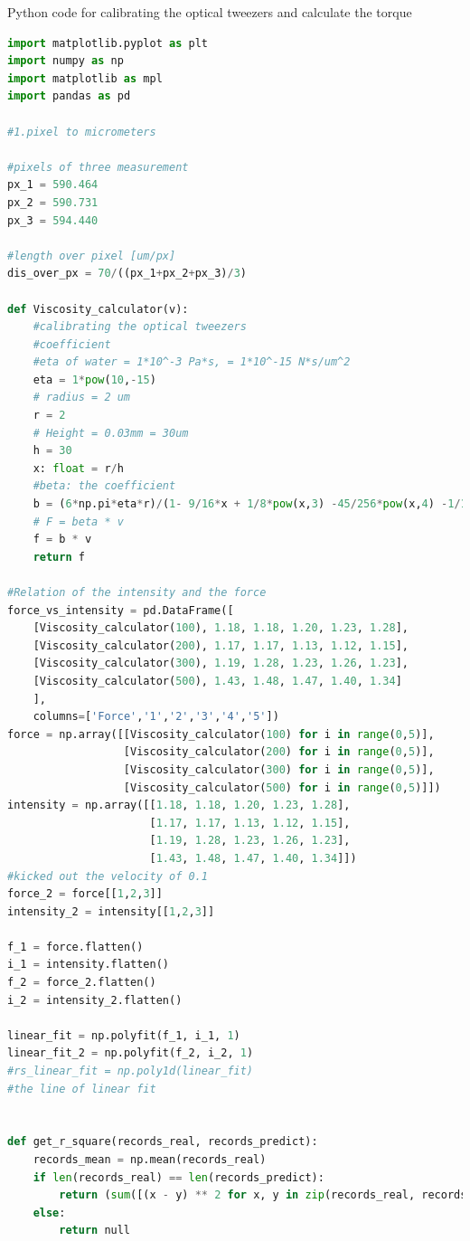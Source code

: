 \documentclass[a4paper,english,12pt,bibliography=totoc]{scrreprt}
\begin{document}
\newpage
Python code for calibrating the optical tweezers and calculate the torque
\begin{lstlisting}[language=python, breaklines=true, breakatwhitespace=true, basicstyle=\footnotesize\ttfamily]
import matplotlib.pyplot as plt
import numpy as np
import matplotlib as mpl
import pandas as pd

#1.pixel to micrometers

#pixels of three measurement
px_1 = 590.464
px_2 = 590.731
px_3 = 594.440

#length over pixel [um/px]
dis_over_px = 70/((px_1+px_2+px_3)/3)

def Viscosity_calculator(v):
    #calibrating the optical tweezers
    #coefficient
    #eta of water = 1*10^-3 Pa*s, = 1*10^-15 N*s/um^2
    eta = 1*pow(10,-15)
    # radius = 2 um
    r = 2
    # Height = 0.03mm = 30um
    h = 30
    x: float = r/h
    #beta: the coefficient
    b = (6*np.pi*eta*r)/(1- 9/16*x + 1/8*pow(x,3) -45/256*pow(x,4) -1/16*pow(x,5))
    # F = beta * v
    f = b * v
    return f

#Relation of the intensity and the force
force_vs_intensity = pd.DataFrame([
    [Viscosity_calculator(100), 1.18, 1.18, 1.20, 1.23, 1.28],
    [Viscosity_calculator(200), 1.17, 1.17, 1.13, 1.12, 1.15],
    [Viscosity_calculator(300), 1.19, 1.28, 1.23, 1.26, 1.23],
    [Viscosity_calculator(500), 1.43, 1.48, 1.47, 1.40, 1.34]
    ],
    columns=['Force','1','2','3','4','5'])
force = np.array([[Viscosity_calculator(100) for i in range(0,5)],
                  [Viscosity_calculator(200) for i in range(0,5)],
                  [Viscosity_calculator(300) for i in range(0,5)],
                  [Viscosity_calculator(500) for i in range(0,5)]])
intensity = np.array([[1.18, 1.18, 1.20, 1.23, 1.28],
                      [1.17, 1.17, 1.13, 1.12, 1.15],
                      [1.19, 1.28, 1.23, 1.26, 1.23],
                      [1.43, 1.48, 1.47, 1.40, 1.34]])
#kicked out the velocity of 0.1
force_2 = force[[1,2,3]]
intensity_2 = intensity[[1,2,3]]

f_1 = force.flatten()
i_1 = intensity.flatten()
f_2 = force_2.flatten()
i_2 = intensity_2.flatten()

linear_fit = np.polyfit(f_1, i_1, 1)
linear_fit_2 = np.polyfit(f_2, i_2, 1)
#rs_linear_fit = np.poly1d(linear_fit)
#the line of linear fit


def get_r_square(records_real, records_predict):
    records_mean = np.mean(records_real)
    if len(records_real) == len(records_predict):
        return (sum([(x - y) ** 2 for x, y in zip(records_real, records_predict)]) / sum([(z-records_mean) ** 2 for z in zip(records_real)]))
    else:
        return null


\end{lstlisting}
\end{document}
